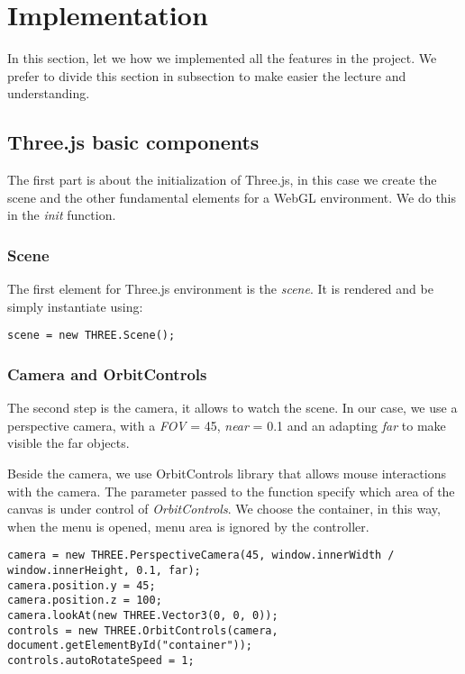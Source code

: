 \documentclass{article}
\begin{document}
\section{Implementation}
In this section, let we how we implemented all the features in the project. We prefer to divide this section in subsection to make easier the lecture and understanding.


\subsection{Three.js basic components}
The first part is about the initialization of Three.js, in this case we create the scene and the other fundamental elements for a WebGL environment. We do this in the \textit{init} function.

\subsubsection{Scene}
The first element for Three.js environment is the \textit{scene}\cite{documentation:threejs}. It is rendered and be simply instantiate using:
\begin{lstlisting}
scene = new THREE.Scene();
\end{lstlisting}

\subsubsection{Camera and OrbitControls}
The second step is the camera, it allows to watch the scene. In our case, we use a perspective camera, with a \textit{FOV} = 45\degree, \textit{near} = 0.1 and an adapting \textit{far} to make visible the far objects\cite{documentation:threejs}.
\par Beside the camera, we use OrbitControls library that allows mouse interactions with the camera. The parameter passed to the function specify which area of the canvas is under control of \textit{OrbitControls}. We choose the container, in this way, when the menu is opened, menu area is ignored by the controller\cite{documentation:threejs}.
\begin{lstlisting}
camera = new THREE.PerspectiveCamera(45, window.innerWidth / window.innerHeight, 0.1, far);
camera.position.y = 45;
camera.position.z = 100;
camera.lookAt(new THREE.Vector3(0, 0, 0));
controls = new THREE.OrbitControls(camera, document.getElementById("container"));
controls.autoRotateSpeed = 1;
\end{lstlisting}
\end{document}
